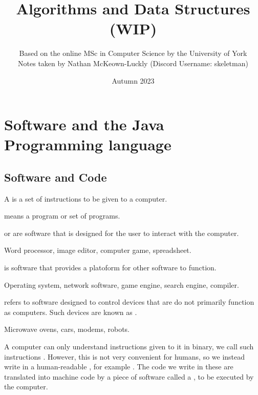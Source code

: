 \documentclass[11pt]{article}
\title{Algorithms and Data Structures (WIP)}
\date{Autumn 2023}
\author{Based on the online MSc in Computer Science by the University of York\\ Notes taken by Nathan McKeown-Luckly (Discord Username: skeletman)}
\begin{document}
\maketitle
\tableofcontents
\pagebreak
\section{Software and the Java Programming language}
\subsection{Software and Code}
\begin{defi}
    A  is a set of instructions to be given to a computer.
\end{defi}
\begin{defi}[Software]
     means a program or set of programs.
\end{defi}
\begin{defi}
     or  are software that is designed for the user to interact with the computer.
\end{defi}
\begin{egs}
    Word processor, image editor, computer game, spreadsheet.
\end{egs}
\begin{defi}
     is software that provides a platoform for other software to function.
\end{defi}
\begin{egs}
    Operating system, network software, game engine, search engine, compiler.
\end{egs}
\begin{defi}
     refers to software designed to control devices that are do not primarily function as computers. Such devices are known as .
\end{defi}
\begin{egs}
    Microwave ovens, cars, modems, robots.
\end{egs}
A computer can only understand instructions given to it in binary, we call such instructions . However, this is not very convenient for humans, so we instead write in a human-readable , for example . The code we write in these are translated into machine code by a piece of software called a , to be executed by the computer.
\end{document}
